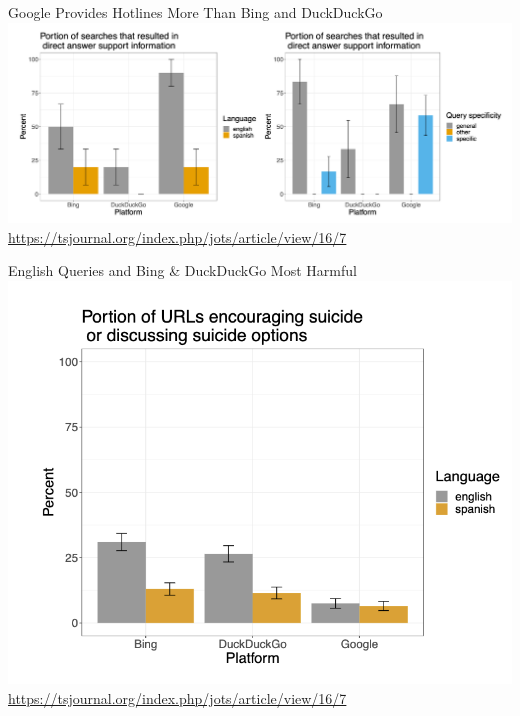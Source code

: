 \documentclass[nobackground,dvipsnames,table,aspectratio=169]{beamer}
\begin{document}
\begin{frame}{Google Provides Hotlines More Than Bing and DuckDuckGo}
    \centering
    \includegraphics[width=\textwidth]{hsehsq-more-hotlines-provided}
    \tiny
    \url{https://tsjournal.org/index.php/jots/article/view/16/7}
\end{frame}

\begin{frame}{English Queries and Bing \& DuckDuckGo Most Harmful}
    \centering
    \includegraphics[height=0.75\textheight]{hsehsq-harmful-results}
    \tiny
    \url{https://tsjournal.org/index.php/jots/article/view/16/7}
\end{frame}
\end{document}
